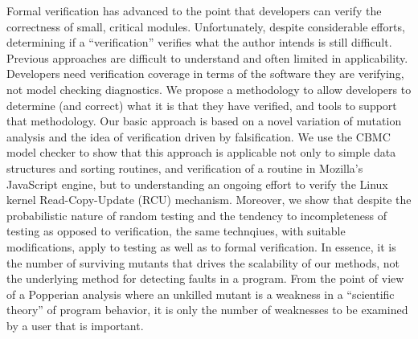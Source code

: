 Formal verification has advanced to the point that developers can verify the correctness of small, critical modules.  Unfortunately, despite considerable efforts, determining if a ``verification'' verifies what the author intends is still difficult.  Previous approaches are difficult to understand and often limited in applicability.  Developers need verification coverage in terms of the software they are verifying, not model checking diagnostics.  We propose a methodology to allow developers to determine (and correct) what it is that they have verified, and tools to support that methodology.  Our basic approach is based on a novel variation of mutation analysis and the idea of verification driven by falsification.  We use the CBMC model checker to show that this approach is applicable not only to simple data structures and sorting routines, and verification of a routine in Mozilla's JavaScript engine, but to understanding an ongoing effort to verify the Linux kernel Read-Copy-Update (RCU) mechanism.  Moreover, we show that despite the probabilistic nature of random testing and the tendency to incompleteness of testing as opposed to verification, the same technqiues, with suitable modifications, apply to testing as well as to formal verification.  In essence, it is the  number of surviving mutants that drives the scalability of our methods, not the underlying method for detecting faults in a program.  From the point of view of a Popperian analysis where an unkilled mutant is a weakness in a ``scientific theory'' of program behavior, it is only the number of weaknesses to be examined by a user that is important.